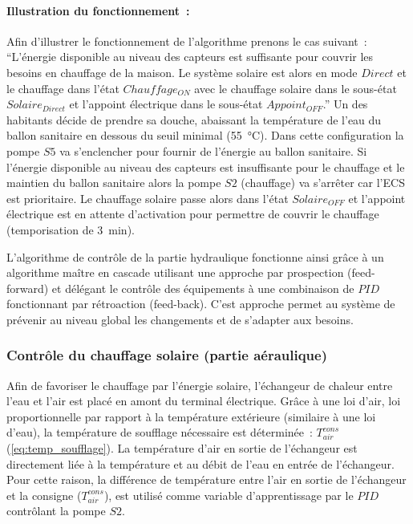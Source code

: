 \paragraph{Illustration du fonctionnement~:} %
\label{par:illustration_du_fonctionnement_}
Afin d’illustrer le fonctionnement de l’algorithme prenons le cas suivant~:
\enquote{L’énergie disponible au niveau des capteurs est suffisante pour couvrir les besoins en chauffage de
la maison. Le système solaire est alors en mode $Direct$ et le chauffage dans l’état
$Chauffage_{ON}$ avec le chauffage solaire dans le sous-état $Solaire_{Direct}$ et
l’appoint électrique dans le sous-état $Appoint_{OFF}$.} Un des habitants décide de
prendre sa douche, abaissant la température de l’eau du ballon sanitaire en dessous du
seuil minimal (\SI{55}{\celsius}). Dans cette configuration la pompe $S5$ va s’enclencher
pour fournir de l’énergie au ballon sanitaire. Si l’énergie disponible au niveau des
capteurs est insuffisante pour le chauffage et le maintien du ballon sanitaire alors la
pompe $S2$ (chauffage) va s’arrêter car l’ECS est prioritaire. Le chauffage solaire passe
alors dans l’état $Solaire_{OFF}$ et l’appoint électrique est en attente d’activation pour
permettre de couvrir le chauffage (temporisation de \SI{3}{\minute}).


L’algorithme de contrôle de la partie hydraulique fonctionne ainsi grâce à un algorithme
maître en cascade utilisant une approche par prospection (feed-forward) et délégant le
contrôle des équipements à une combinaison de $PID$ fonctionnant par rétroaction (feed-back).
C’est approche permet au système de prévenir au niveau global les changements et de
s’adapter aux besoins.


\subsubsection{Contrôle du chauffage solaire (partie aéraulique)} %
\label{ssub:controle_du_chauffage_solaire}
Afin de favoriser le chauffage par l’énergie solaire, l’échangeur de chaleur entre l’eau
et l’air est placé en amont du terminal électrique. Grâce à une loi d’air, loi
proportionnelle par rapport à la température extérieure (similaire à une loi d’eau), la
température de soufflage nécessaire est déterminée~: $T_{air}^{cons}$ (\autoref{eq:temp_soufflage}).
La température d’air en sortie de l’échangeur est directement liée à la température et au
débit de l’eau en entrée de l’échangeur. Pour cette raison, la différence de température
entre l’air en sortie de l’échangeur et la consigne ($T_{air}^{cons}$), est utilisé comme
variable d’apprentissage par le $PID$ contrôlant la pompe $S2$.

